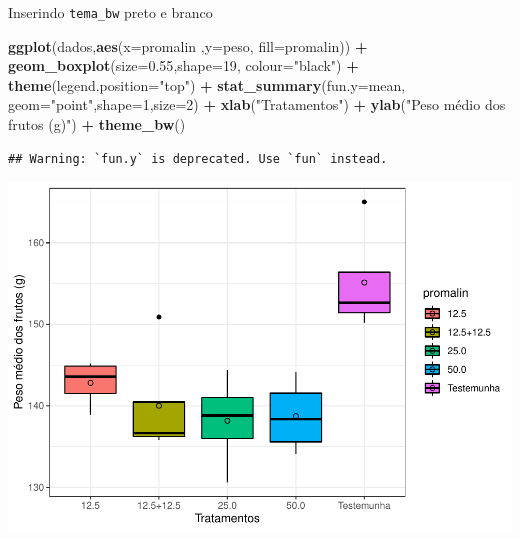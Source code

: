 \documentclass[
]{book}
\newenvironment{Shaded}{\begin{snugshade}}{\end{snugshade}}
\newcommand{\DataTypeTok}[1]{\textcolor[rgb]{0.13,0.29,0.53}{#1}}
\newcommand{\DecValTok}[1]{\textcolor[rgb]{0.00,0.00,0.81}{#1}}
\newcommand{\FloatTok}[1]{\textcolor[rgb]{0.00,0.00,0.81}{#1}}
\newcommand{\KeywordTok}[1]{\textcolor[rgb]{0.13,0.29,0.53}{\textbf{#1}}}
\newcommand{\NormalTok}[1]{#1}
\newcommand{\OperatorTok}[1]{\textcolor[rgb]{0.81,0.36,0.00}{\textbf{#1}}}
\newcommand{\StringTok}[1]{\textcolor[rgb]{0.31,0.60,0.02}{#1}}
\begin{document}
Inserindo \texttt{tema\_bw} preto e branco

\begin{Shaded}
\begin{Highlighting}[]
\KeywordTok{ggplot}\NormalTok{(dados,}\KeywordTok{aes}\NormalTok{(}\DataTypeTok{x=}\NormalTok{promalin ,}\DataTypeTok{y=}\NormalTok{peso, }\DataTypeTok{fill=}\NormalTok{promalin)) }\OperatorTok{+}\StringTok{ }
\StringTok{      }\KeywordTok{geom_boxplot}\NormalTok{(}\DataTypeTok{size=}\FloatTok{0.55}\NormalTok{,}\DataTypeTok{shape=}\DecValTok{19}\NormalTok{, }\DataTypeTok{colour=}\StringTok{"black"}\NormalTok{) }\OperatorTok{+}\StringTok{ }
\StringTok{      }\KeywordTok{theme}\NormalTok{(}\DataTypeTok{legend.position=}\StringTok{"top"}\NormalTok{) }\OperatorTok{+}\StringTok{ }
\StringTok{      }\KeywordTok{stat_summary}\NormalTok{(}\DataTypeTok{fun.y=}\NormalTok{mean, }\DataTypeTok{geom=}\StringTok{"point"}\NormalTok{,}\DataTypeTok{shape=}\DecValTok{1}\NormalTok{,}\DataTypeTok{size=}\DecValTok{2}\NormalTok{) }\OperatorTok{+}\StringTok{ }
\StringTok{      }\KeywordTok{xlab}\NormalTok{(}\StringTok{"Tratamentos"}\NormalTok{) }\OperatorTok{+}\StringTok{  }
\StringTok{      }\KeywordTok{ylab}\NormalTok{(}\StringTok{"Peso médio dos frutos (g)"}\NormalTok{)  }\OperatorTok{+}
\StringTok{      }\KeywordTok{theme_bw}\NormalTok{() }
\end{Highlighting}
\end{Shaded}

\begin{verbatim}
## Warning: `fun.y` is deprecated. Use `fun` instead.
\end{verbatim}

\includegraphics{TudodoR_files/figure-latex/unnamed-chunk-237-1.pdf}
\end{document}
